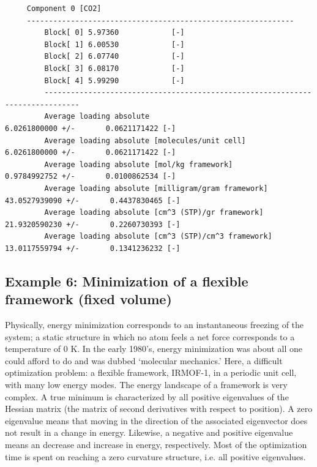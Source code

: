 \begin{tiny}
\begin{verbatim}
     Component 0 [CO2]
     -------------------------------------------------------------
         Block[ 0] 5.97360            [-]
         Block[ 1] 6.00530            [-]
         Block[ 2] 6.07740            [-]
         Block[ 3] 6.08170            [-]
         Block[ 4] 5.99290            [-]
         ------------------------------------------------------------------------------
         Average loading absolute                              6.0261800000 +/-       0.0621171422 [-]
         Average loading absolute [molecules/unit cell]        6.0261800000 +/-       0.0621171422 [-]
         Average loading absolute [mol/kg framework]                  0.9784992752 +/-       0.0100862534 [-]
         Average loading absolute [milligram/gram framework]         43.0527939090 +/-       0.4437830465 [-]
         Average loading absolute [cm^3 (STP)/gr framework]          21.9320590230 +/-       0.2260730393 [-]
         Average loading absolute [cm^3 (STP)/cm^3 framework]        13.0117559794 +/-       0.1341236232 [-]
\end{verbatim}
\end{tiny}

\subsection*{Example 6: Minimization of a flexible framework (fixed volume)}

Physically, energy minimization corresponds to an instantaneous freezing of the system; a static structure in 
which no atom feels a net force corresponds to a temperature of 0 K. In the early 1980's, energy minimization was 
about all one could afford to do and was dubbed `molecular mechanics.' Here, a difficult optimization problem:
a flexible framework, IRMOF-1, in a periodic unit cell, with many low energy modes.
The energy landscape of a framework is very complex. A true minimum is characterized by
all positive eigenvalues of the Hessian matrix (the matrix of second derivatives with respect to position). A
zero eigenvalue means that moving in the direction of the associated eigenvector does not result in a change in
energy. Likewise, a negative and positive eigenvalue means an decrease and increase in energy, respectively.
Most of the optimization time is spent on reaching a zero curvature structure, i.e. all positive eigenvalues.

